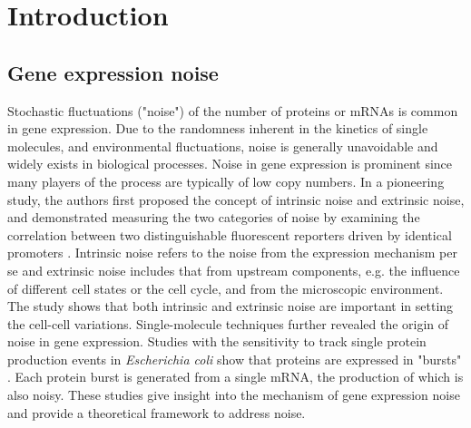 
\chapter{Introduction}  %



\section{Gene expression noise}

Stochastic fluctuations ("noise") of the number of 
proteins or mRNAs is common in gene expression.
Due to the randomness inherent in the kinetics of single molecules,
and environmental fluctuations, noise is generally unavoidable and
widely exists in biological processes.
Noise in gene expression is prominent since many players of the process are
typically of low copy numbers.
In a pioneering study, the authors first proposed
the concept of intrinsic noise and extrinsic noise, and demonstrated measuring
the two categories of noise by examining the correlation between two
distinguishable fluorescent reporters driven by identical promoters 
\cite{elowitz02a}.
Intrinsic noise refers to the noise from the expression mechanism per se and
extrinsic noise includes that from upstream components, e.g.
the influence of different cell states or the cell cycle, 
and from the microscopic environment.
The study shows that both intrinsic and extrinsic noise are important in
setting the cell-cell variations.
Single-molecule techniques further revealed the origin of noise in gene
expression. Studies with the sensitivity to track single protein production events
in \textit{Escherichia coli} show that proteins are expressed in "bursts"
\cite{cai06a, yu06a}.
Each protein burst is generated from a single mRNA,
the production of which is also noisy.
These studies give insight into the mechanism of gene expression noise
and provide a theoretical framework to address noise.

